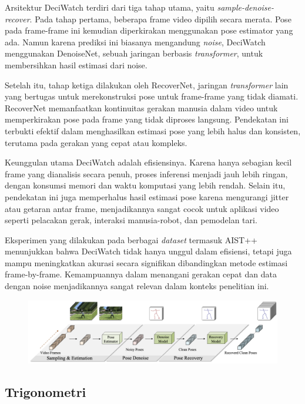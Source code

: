 Arsitektur DeciWatch terdiri dari tiga tahap utama, yaitu \textit{sample-denoise-recover}. Pada tahap pertama, beberapa frame video dipilih secara merata. Pose pada frame-frame ini kemudian diperkirakan menggunakan pose estimator yang ada. Namun karena prediksi ini biasanya mengandung \textit{noise}, DeciWatch menggunakan DenoiseNet, sebuah jaringan berbasis \textit{transformer}, untuk membersihkan hasil estimasi dari noise.

Setelah itu, tahap ketiga dilakukan oleh RecoverNet, jaringan \textit{transformer} lain yang bertugas untuk merekonstruksi pose untuk frame-frame yang tidak diamati. RecoverNet memanfaatkan kontinuitas gerakan manusia dalam video untuk memperkirakan pose pada frame yang tidak diproses langsung. Pendekatan ini terbukti efektif dalam menghasilkan estimasi pose yang lebih halus dan konsisten, terutama pada gerakan yang cepat atau kompleks.

Keunggulan utama DeciWatch adalah efisiensinya. Karena hanya sebagian kecil frame yang dianalisis secara penuh, proses inferensi menjadi jauh lebih ringan, dengan konsumsi memori dan waktu komputasi yang lebih rendah. Selain itu, pendekatan ini juga memperhalus hasil estimasi pose karena mengurangi jitter atau getaran antar frame, menjadikannya sangat cocok untuk aplikasi video seperti pelacakan gerak, interaksi manusia-robot, dan pemodelan tari.

Eksperimen yang dilakukan pada berbagai \textit{dataset} termasuk AIST++ menunjukkan bahwa DeciWatch tidak hanya unggul dalam efisiensi, tetapi juga mampu meningkatkan akurasi secara signifikan dibandingkan metode estimasi frame-by-frame. Kemampuannya dalam menangani gerakan cepat dan data dengan noise menjadikannya sangat relevan dalam konteks penelitian ini.

\begin{figure}[H]
    \centering
    \includegraphics[width=\textwidth]{images/deciwatch_architecture.png}
    \label{fig:deciwatch_architecture}
\end{figure}

\subsection{Trigonometri}

